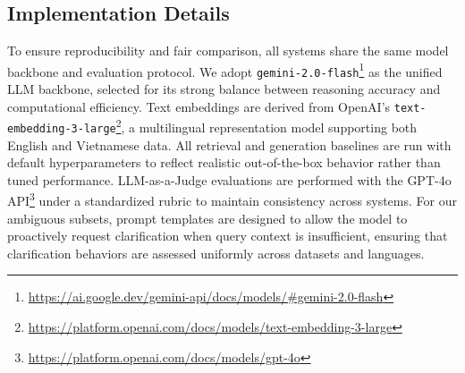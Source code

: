 \documentclass[11pt]{article}
\begin{document}
\subsection{Implementation Details}
\label{sec:implementation}

To ensure reproducibility and fair comparison, all systems share the same model backbone and evaluation protocol. We adopt \texttt{gemini-2.0-flash}\footnote{\url{https://ai.google.dev/gemini-api/docs/models/\#gemini-2.0-flash}} as the unified LLM backbone, selected for its strong balance between reasoning accuracy and computational efficiency. Text embeddings are derived from OpenAI’s \texttt{text-embedding-3-large}\footnote{\url{https://platform.openai.com/docs/models/text-embedding-3-large}}, a multilingual representation model supporting both English and Vietnamese data. All retrieval and generation baselines are run with default hyperparameters to reflect realistic out-of-the-box behavior rather than tuned performance. LLM-as-a-Judge evaluations are performed with the GPT-4o API\footnote{\url{https://platform.openai.com/docs/models/gpt-4o}} under a standardized rubric to maintain consistency across systems. For our ambiguous subsets, prompt templates are designed to allow the model to proactively request clarification when query context is insufficient, ensuring that clarification behaviors are assessed uniformly across datasets and languages. 






\end{document}

